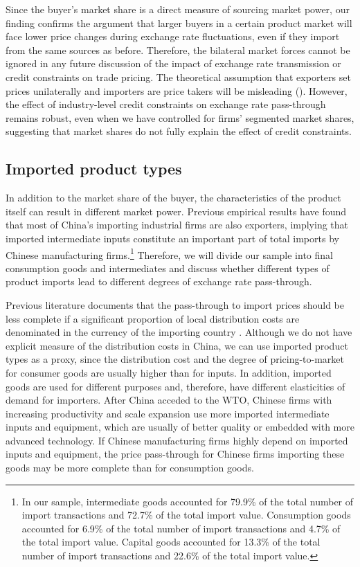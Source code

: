 Since the buyer's market share is a direct measure of sourcing market power, our finding confirms the argument that larger buyers in a certain product market will face lower price changes during exchange rate fluctuations, even if they import from the same sources as before. Therefore, the bilateral market forces cannot be ignored in any future discussion of the impact of exchange rate transmission or credit constraints on trade pricing. The theoretical assumption that exporters set prices unilaterally and importers are price takers will be misleading (\cite{alviarez2023}). However, the effect of industry-level credit constraints on exchange rate pass-through remains robust, even when we have controlled for firms' segmented market shares, suggesting that market shares do not fully explain the effect of credit constraints.

\subsection{Imported product types}

In addition to the market share of the buyer, the characteristics of the product itself can result in different market power. Previous empirical results have found that most of China's importing industrial firms are also exporters, implying that imported intermediate inputs constitute an important part of total imports by Chinese manufacturing firms.\footnote{In our sample, intermediate goods accounted for 79.9\% of the total number of import transactions and 72.7\% of the total import value. Consumption goods accounted for 6.9\% of the total number of import transactions and 4.7\% of the total import value. Capital goods accounted for 13.3\% of the total number of import transactions and 22.6\% of the total import value.} Therefore, we will divide our sample into final consumption goods and intermediates and discuss whether different types of product imports lead to different degrees of exchange rate pass-through.

Previous literature documents that the pass-through to import prices should be less complete if a significant proportion of local distribution costs are denominated in the currency of the importing country \citep{campa2005}. Although we do not have explicit measure of the distribution costs in China, we can use imported product types as a proxy, since the distribution cost and the degree of pricing-to-market for consumer goods are usually higher than for inputs. In addition, imported goods are used for different purposes and, therefore, have different elasticities of demand for importers. After China acceded to the WTO, Chinese firms with increasing productivity and scale expansion use more imported intermediate inputs and equipment, which are usually of better quality or embedded with more advanced technology. If Chinese manufacturing firms highly depend on imported inputs and equipment, the price pass-through for Chinese firms importing these goods may be more complete than for consumption goods.

